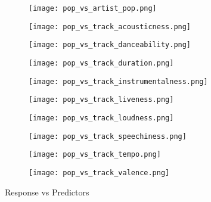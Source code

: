 \documentclass[12pt, twoside]{article}
\begin{document}
\begin{figure}[H]
\begin{subfigure}[b]{0.5\textwidth}
\centering
\texttt{[image: pop\_vs\_artist\_pop.png]}
\caption{}
\label{fig:danceability_trend}
\end{subfigure}
\begin{subfigure}[b]{0.5\textwidth}
\centering
\texttt{[image: pop\_vs\_track\_acousticness.png]}
\caption{}
\label{fig:instrumentalness_trend}
\end{subfigure}
\begin{subfigure}[b]{0.5\textwidth}
\centering
\texttt{[image: pop\_vs\_track\_danceability.png]}
\caption{}
\label{fig:loudness_trend}
\end{subfigure}
\begin{subfigure}[b]{0.5\textwidth}
\centering
\texttt{[image: pop\_vs\_track\_duration.png]}
\caption{}
\label{fig:duration_trend}
\end{subfigure}
\begin{subfigure}[b]{0.5\textwidth}
\centering
\texttt{[image: pop\_vs\_track\_instrumentalness.png]}
\caption{}
\label{fig:duration_trend}
\end{subfigure}
\begin{subfigure}[b]{0.5\textwidth}
\centering
\texttt{[image: pop\_vs\_track\_liveness.png]}
\caption{}
\label{fig:duration_trend}
\end{subfigure}
\label{fig:multipart_figure}
\end{figure}

\begin{figure}[H]
\ContinuedFloat
\begin{subfigure}[b]{0.5\textwidth}
\centering
\texttt{[image: pop\_vs\_track\_loudness.png]}
\caption{}
\label{fig:duration_trend}
\end{subfigure}
\begin{subfigure}[b]{0.5\textwidth}
\centering
\texttt{[image: pop\_vs\_track\_speechiness.png]}
\caption{}
\label{fig:duration_trend}
\end{subfigure}
\begin{subfigure}[b]{0.5\textwidth}
\centering
\texttt{[image: pop\_vs\_track\_tempo.png]}
\caption{}
\label{fig:duration_trend}
\end{subfigure}
\begin{subfigure}[b]{0.5\textwidth}
\centering
\texttt{[image: pop\_vs\_track\_valence.png]}
\caption{}
\label{fig:duration_trend}
\end{subfigure}
\caption{Response vs Predictors}
\end{figure}
\end{document}
